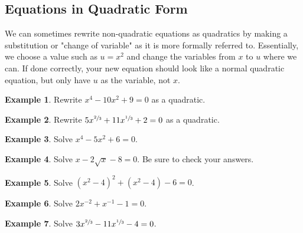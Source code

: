 \documentclass[addpoints,12pt]{exam}
\theoremstyle{definition}
\theoremstyle{break}
\theoremstyle{break}
\newtheorem{example}{Example}[subsection]
\begin{document}
\setcounter{section}{11}
\setcounter{subsection}{3}

\subsection{Equations in Quadratic Form}
We can sometimes rewrite non-quadratic equations as quadratics by making a substitution or "change of variable" as it is more formally referred to. Essentially, we choose a value such as $u = x^2$ and change the variables from $x$ to $u$ where we can. If done correctly, your new equation should look like a normal quadratic equation, but only have $u$ as the variable, not $x$.
\vspace{.15in}

\begin{example}
Rewrite $x^4 - 10x^2 + 9 = 0$ as a quadratic.
\vspace{1in}
\end{example}

\begin{example}
Rewrite $5x^{\sfrac{2}{3}} + 11x^{\sfrac{1}{3}} + 2 = 0$ as a quadratic.
\vspace{1in}
\end{example}

\begin{example}
Solve $x^4 - 5x^2 + 6 = 0$.
\end{example}

\newpage

\begin{example}
Solve $x - 2\sqrt{x} - 8 = 0$. Be sure to check your answers.
\end{example}

\newpage

\begin{example}
Solve $(x^2 - 4)^2 + (x^2 - 4) - 6 = 0$.
\vspace{3in}
\end{example}

\begin{example}
Solve $2x^{-2} + x^{-1} - 1 = 0$.
\end{example}

\newpage

\begin{example}
Solve $3x^{\sfrac{2}{3}} - 11x^{\sfrac{1}{3}} - 4 = 0$.
\end{example}
\end{document}
